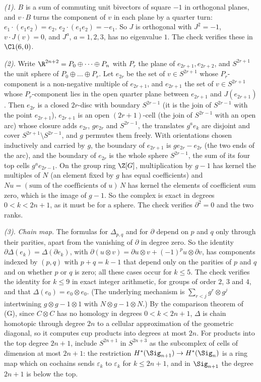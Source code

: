 \emph{(1).} $B$ is a sum of commuting unit bivectors of square $-1$ in orthogonal planes, and $v \cdot B$ turns the component of $v$ in each plane by a quarter turn: $e_{1} \cdot (e_{1}e_{2}) = e_{2}$, $e_{2} \cdot (e_{1}e_{2}) = -e_{1}$. So $J$ is orthogonal with $J^{2} = -1$, $v \cdot J(v) = 0$, and $J^{a}$, $a = 1, 2, 3$, has no eigenvalue $1$. The check verifies these in $\Cl(6,0)$.

\emph{(2).} Write $\R^{2n+2} = P_{0} \oplus \dots \oplus P_{n}$ with $P_{r}$ the plane of $e_{2r+1}, e_{2r+2}$, and $S^{2r+1}$ the unit sphere of $P_{0} \oplus \dots \oplus P_{r}$. Let $e_{2r}$ be the set of $v \in S^{2r+1}$ whose $P_{r}$-component is a non-negative multiple of $e_{2r+1}$, and $e_{2r+1}$ the set of $v \in S^{2r+1}$ whose $P_{r}$-component lies in the open quarter plane between $e_{2r+1}$ and $J(e_{2r+1})$. Then $e_{2r}$ is a closed $2r$-disc with boundary $S^{2r-1}$ (it is the join of $S^{2r-1}$ with the point $e_{2r+1}$), $e_{2r+1}$ is an open $(2r+1)$-cell (the join of $S^{2r-1}$ with an open arc) whose closure adds $e_{2r}$, $g e_{2r}$ and $S^{2r-1}$, the translates $g^{a}e_{k}$ are disjoint and cover $S^{2r+1} \setminus S^{2r-1}$, and $g$ permutes them freely. With orientations chosen inductively and carried by $g$, the boundary of $e_{2r+1}$ is $g e_{2r} - e_{2r}$ (the two ends of the arc), and the boundary of $e_{2r}$ is the whole sphere $S^{2r-1}$, the sum of its four top cells $g^{a}e_{2r-1}$. On the group ring $\Z[G]$, multiplication by $g - 1$ has kernel the multiples of $N$ (an element fixed by $g$ has equal coefficients) and $N u = (\text{sum of the coefficients of } u)\,N$ has kernel the elements of coefficient sum zero, which is the image of $g - 1$. So the complex is exact in degrees $0 < k < 2n+1$, as it must be for a sphere. The check verifies $\partial^{2} = 0$ and the two ranks.

\emph{(3).} \emph{Chain map.} The formulas for $\Delta_{p,q}$ and for $\partial$ depend on $p$ and $q$ only through their parities, apart from the vanishing of $\partial$ in degree zero. So the identity $\partial\Delta(e_{k}) = \Delta(\partial e_{k})$, with $\partial(u \otimes v) = \partial u \otimes v + (-1)^{p}u \otimes \partial v$, has components indexed by $(p, q)$ with $p + q = k - 1$ that depend only on the parities of $p$ and $q$ and on whether $p$ or $q$ is zero; all these cases occur for $k \leq 5$. The check verifies the identity for $k \leq 9$ in exact integer arithmetic, for groups of order $2$, $3$ and $4$, and that $\Delta(e_{0}) = e_{0} \otimes e_{0}$. (The underlying mechanism is $\sum_{r<j} g^{r} \otimes g^{j}$ intertwining $g \otimes g - 1 \otimes 1$ with $N \otimes g - 1 \otimes N$.) By the comparison theorem of (G), since $C \otimes C$ has no homology in degrees $0 < k < 2n+1$, $\Delta$ is chain homotopic through degree $2n$ to a cellular approximation of the geometric diagonal, so it computes cup products into degrees at most $2n$. For products into the top degree $2n+1$, include $S^{2n+1}$ in $S^{2n+3}$ as the subcomplex of cells of dimension at most $2n+1$: the restriction $H^{*}(\Sig_{n+1}) \to H^{*}(\Sig_{n})$ is a ring map which on cochains sends $\varepsilon_{k}$ to $\varepsilon_{k}$ for $k \leq 2n+1$, and in $\Sig_{n+1}$ the degree $2n+1$ is below the top.

